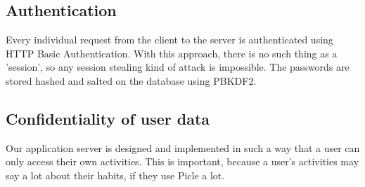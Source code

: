 \subsection{Authentication}
Every individual request from the client to the server is authenticated using HTTP Basic
Authentication. With this approach, there is no such thing as a 'session', so any
session stealing kind of attack is impossible. The passwords are stored hashed and salted
on the database using PBKDF2.

\subsection{Confidentiality of user data}
Our application server is designed and implemented in such a way that a user can only
access their own activities. This is important, because a user's activities may say a lot
about their habits, if they use Picle a lot.
